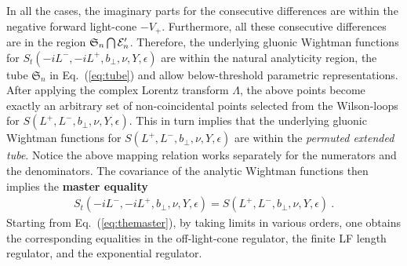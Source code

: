 \documentclass[a4paper,11pt]{article}
\begin{document}
In all the cases, the imaginary parts for the consecutive differences are within the negative forward light-cone $-V_+$. Furthermore, all these consecutive differences are in the region $\mathfrak{S}_n \bigcap {\cal E}_n'$.  Therefore, the underlying gluonic Wightman functions for $S_t(-iL^-,-iL^+,b_\perp,\nu, Y,\epsilon)$ are within the natural analyticity region, the tube $\mathfrak{S}_n$ in Eq.~(\ref{eq:tube}) and allow below-threshold parametric representations. After applying the complex Lorentz transform $\Lambda$, the above points become exactly an arbitrary set of non-coincidental points selected from the Wilson-loops for $S(L^+,L^-,b_\perp,\nu, Y,\epsilon)$. This in turn implies that the underlying gluonic Wightman functions for $S(L^+,L^-,b_\perp,\nu, Y,\epsilon)$ are within the {\it permuted extended tube}. Notice the above mapping relation works separately for the numerators and the denominators.  The covariance of the analytic Wightman functions then implies the {\bf master equality}
\begin{align}\label{eq:themaster}
S_t(-iL^-,-iL^+,b_\perp,\nu,Y,\epsilon)=S(L^+,L^-,b_\perp, \nu, Y,\epsilon) \ .
\end{align}
Starting from Eq.~(\ref{eq:themaster}), by taking limits in various orders, one obtains the corresponding equalities in the off-light-cone regulator, the finite LF length regulator, and the exponential regulator.
\end{document}
